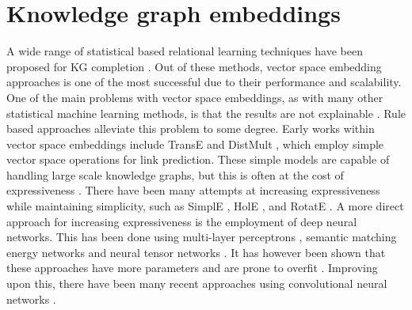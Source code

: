 \section{Knowledge graph embeddings}
A wide range of statistical based relational learning techniques have been proposed for KG completion \cite{nickel2015review}. Out of these methods, vector space embedding approaches is one of the most successful due to their performance and scalability. One of the main problems with vector space embeddings, as with many other statistical machine learning methods, is that the results are not explainable \cite{bonatti2019knowledge}. Rule based approaches alleviate this problem to some degree. Early works within vector space embeddings include TransE \cite{TransE} and DistMult \cite{yang2014embedding}, which employ simple vector space operations for link prediction. These simple models are capable of handling large scale knowledge graphs, but this is often at the cost of expressiveness \cite{dettmers2018convolutional}. There have been many attempts at increasing expressiveness while maintaining simplicity, such as SimplE \cite{SimplE}, HolE \cite{holE}, and RotatE \cite{rotatE}. A more direct approach for increasing expressiveness is the employment of deep neural networks. This has been done using multi-layer perceptrons \cite{dong2014knowledge}, semantic matching energy networks \cite{bordes2014semantic} and neural tensor networks \cite{socher2013reasoning}. It has however been shown that these approaches have more parameters and are prone to overfit \cite{nickel2015review}. Improving upon this, there have been many recent approaches using convolutional neural networks \cite{dettmers2018convolutional, nguyen2017novel, jiang2019adaptive, jiang2021kernel} .


